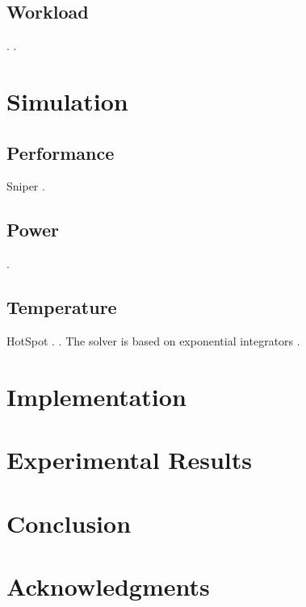 \documentclass[conference]{IEEEtran}
\begin{document}
  \subsection{Workload}
   \cite{bienia2011}.
   \cite{cpu2006}.

  \section{Simulation}
  \subsection{Performance}
  Sniper \cite{carlson2011}.
  

  \subsection{Power}
   \cite{li2009}.

  \subsection{Temperature}
  HotSpot \cite{skadron2004}.
   \cite{sridhar2010}.
  The solver is based on exponential integrators \cite{ukhov2012}.

  \section{Implementation}
  

  \section{Experimental Results}

  \section{Conclusion}
  

  \section*{Acknowledgments}
  

  \begingroup
    
    
  \endgroup
\end{document}
